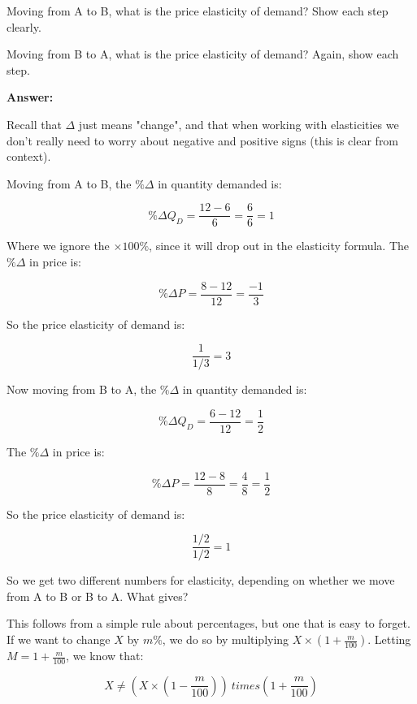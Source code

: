 \documentclass[12pt]{article}
\begin{document}
Moving from A to B, what is the price elasticity of demand? Show each step clearly.

\vspace{2mm}

Moving from B to A, what is the price elasticity of demand? Again, show each step.

\vspace{5mm}

\textbf{Answer:}

\vspace{2mm}

Recall that $\Delta$ just means "change", and that when working with elasticities we don't really need to worry about negative and positive signs (this is clear from context).

\vspace{2mm}

Moving from A to B, the $\% \Delta$ in quantity demanded is:

$$\% \Delta Q_D = \dfrac{12-6}{6} = \dfrac{6}{6} = 1$$

Where we ignore the $\times 100 \%$, since it will drop out in the elasticity formula. The $\% \Delta$ in price is:

$$\% \Delta P = \dfrac{8-12}{12} = \dfrac{-1}{3} $$

So the price elasticity of demand is:

$$ \dfrac{1}{1/3} = 3 $$

Now moving from B to A, the $\% \Delta$ in quantity demanded is:

$$\% \Delta Q_D = \dfrac{6-12}{12} = \dfrac{1}{2}$$

The $\% \Delta$ in price is:

$$\% \Delta P = \dfrac{12-8}{8} = \dfrac{4}{8} = \dfrac{1}{2} $$

So the price elasticity of demand is:

$$ \dfrac{1/2}{1/2} = 1 $$ 

So we get two different numbers for elasticity, depending on whether we move from A to B or B to A. What gives?

\vspace{2mm}

This follows from a simple rule about percentages, but one that is easy to forget. If we want to change $X$ by $m\%$, we do so by multiplying $X \times (1 + \frac{m}{100})$. Letting $M = 1 + \frac{m}{100}$, we know that:

$$ X \neq (X \times (1 - \frac{m}{100})) \ times (1 + \frac{m}{100}) $$
\end{document}
